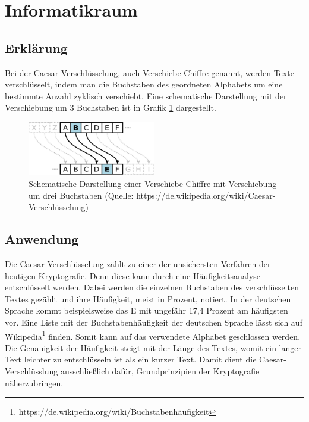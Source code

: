 \documentclass[12pt, letterpaper]{article}
\begin{document}
\section{Informatikraum}

\subsection{Erklärung}

Bei der Caesar-Verschlüsselung, auch Verschiebe-Chiffre genannt, werden Texte verschlüsselt, indem man die Buchstaben des geordneten Alphabets um eine bestimmte Anzahl zyklisch verschiebt.
Eine schematische Darstellung mit der Verschiebung um 3 Buchstaben ist in Grafik \ref{fig:caesar3} dargestellt.

\begin{figure}[h]
    \centering
    \includegraphics[width=0.5\textwidth]{caesar3}
    \caption{Schematische Darstellung einer Verschiebe-Chiffre mit Verschiebung um drei Buchstaben (Quelle: https://de.wikipedia.org/wiki/Caesar-Verschlüsselung)}
    \label{fig:caesar3}
\end{figure}

\subsection{Anwendung}

Die Caesar-Verschlüsselung zählt zu einer der unsichersten Verfahren der heutigen Kryptografie.
Denn diese kann durch eine Häufigkeitsanalyse entschlüsselt werden.
Dabei werden die einzelnen Buchstaben des verschlüsselten Textes gezählt und ihre Häufigkeit, meist in Prozent, notiert.
In der deutschen Sprache kommt beispielsweise das E mit ungefähr 17,4 Prozent am häufigsten vor.
Eine Liste mit der Buchstabenhäufigkeit der deutschen Sprache lässt sich auf Wikipedia\footnote{https://de.wikipedia.org/wiki/Buchstabenhäufigkeit} finden.
Somit kann auf das verwendete Alphabet geschlossen werden.
Die Genauigkeit der Häufigkeit steigt mit der Länge des Textes, womit ein langer Text leichter zu entschlüsseln ist als ein kurzer Text.
Damit dient die Caesar-Verschlüsslung ausschließlich dafür, Grundprinzipien der Kryptografie näherzubringen.
\end{document}
